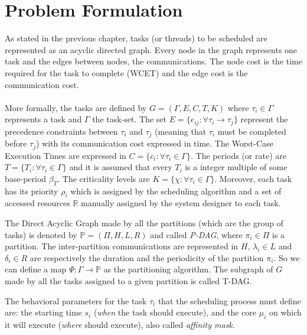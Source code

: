 \section{Problem Formulation}
As stated in the previous chapter, tasks (or threads) to be scheduled are represented as an acyclic directed graph. Every node in the graph represents one task and the edges between nodes, the communications. The node cost is the time required for the task to complete (WCET) and the edge cost is the communication cost. 

\paragraph{} More formally, the tasks are defined by $G=(\Gamma,E,C,T,K)$ where $\tau_i\in\Gamma$ represents a task and $\Gamma$ the task-set. The set $E=\{e_{ij}:\forall\tau_i\to\tau_j\}$ represent the precedence constraints between $\tau_i$ and $\tau_j$ (meaning that $\tau_i$ must be completed before $\tau_j$) with its communication cost expressed in time. The Worst-Case Execution Times are expressed in $C=\{c_i:\forall\tau_i\in\Gamma\}$. The periods (or rate) are $T=\{T_i:\forall\tau_i\in\Gamma\}$ and it is assumed that every $T_i$ is a integer multiple of some base-period $\beta_T$. The criticality levels are $K=\{\chi:\forall\tau_i\in\Gamma\}$. Moreover, each task has its priority $\rho_i$ which is assigned by the scheduling algorithm and a set of accessed resources $\mathbb{R}$ manually assigned by the system designer to each task.
\par The Direct Acyclic Graph made by all the partitions (which are the group of tasks) is denoted by $\mathbb{P}=(\Pi, H, L, R)$ and called \emph{P-DAG}, where $\pi_i\in\Pi$ is a partition. The inter-partition communications are represented in $H$, $\lambda_i\in L$ and $\delta_i\in R$ are respectively the duration and the periodicity of the partition $\pi_i$. So we can define a map $\Psi:\Gamma\to\mathbb{P}$ as the partitioning algorithm. The subgraph of $G$ made by all the tasks assigned to a given partition is called T-DAG.
\par The behavioral parameters for the task $\tau_i$ that the scheduling process must define are: the starting time $s_i$ (\emph{when} the task should execute), and the core $\mu_i$ on which it will execute (\emph{where} should execute), also called \emph{affinity mask}.

